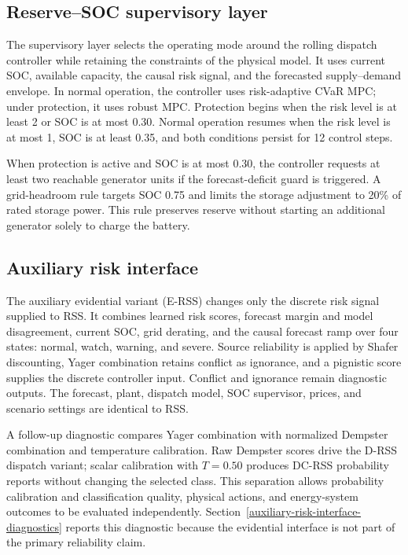 \subsection{Reserve--SOC supervisory layer}\label{soc-supervisory-layer}

The supervisory layer selects the operating mode around the rolling dispatch
controller while retaining the constraints of the physical model. It uses
current SOC, available capacity, the causal risk signal, and the forecasted
supply--demand envelope. In normal operation, the controller uses
risk-adaptive CVaR MPC; under protection, it uses robust MPC. Protection begins
when the risk level is at least 2 or SOC is at most 0.30. Normal operation
resumes when the risk level is at most 1, SOC is at least 0.35, and both
conditions persist for 12 control steps.

When protection is active and SOC is at most 0.30, the controller requests at
least two reachable generator units if the forecast-deficit guard is
triggered. A grid-headroom rule targets SOC 0.75 and limits the storage
adjustment to 20\% of rated storage power. This rule preserves reserve without
starting an additional generator solely to charge the battery.

\subsection{Auxiliary risk interface}\label{auxiliary-risk-interface}

The auxiliary evidential variant (E-RSS) changes only the discrete risk signal
supplied to RSS. It combines learned risk scores, forecast margin and model
disagreement, current SOC, grid derating, and the causal forecast ramp over
four states: normal, watch, warning, and severe. Source reliability is applied
by Shafer discounting, Yager combination retains conflict as ignorance, and a
pignistic score supplies the discrete controller input. Conflict and ignorance
remain diagnostic outputs. The forecast, plant, dispatch model, SOC supervisor,
prices, and scenario settings are identical to RSS.

A follow-up diagnostic compares Yager combination with normalized Dempster
combination and temperature calibration. Raw Dempster scores drive the D-RSS
dispatch variant; scalar calibration with $T=0.50$ produces DC-RSS probability
reports without changing the selected class. This separation allows
probability calibration and classification quality, physical actions, and
energy-system outcomes to be evaluated independently.
Section~\ref{auxiliary-risk-interface-diagnostics} reports this diagnostic
because the evidential interface is not part of the primary reliability claim.

